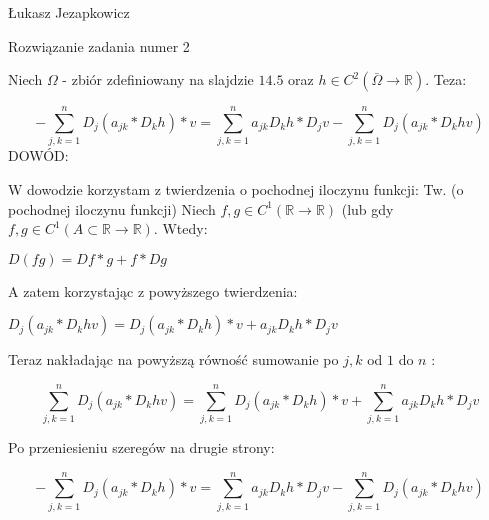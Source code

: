 \documentclass[12pt]{article}
\begin{document}
\begin{center}
\Large Łukasz Jezapkowicz
\end{center}
\begin{center}
\Large Rozwiązanie zadania numer 2 
\end{center}
Niech $\Omega$ - zbiór zdefiniowany na slajdzie $14.5$ oraz $h\in{C}^2(\bar{\Omega}\to\mathbb{R})$. Teza:
\begin{center}
\Large $$-\sum_{j,k=1}^{n} D_j(a_{jk}*D_kh)*v = \sum_{j,k=1}^{n}a_{jk}D_kh*D_jv-\sum_{j,k=1}^{n}D_j(a_{jk}*D_khv)$$ \newline
DOWÓD:
\end{center} 
W dowodzie korzystam z twierdzenia o pochodnej iloczynu funkcji: \newline
Tw. (o pochodnej iloczynu funkcji) \newline
Niech $f,g\in{C}^1(\mathbb{R}\to\mathbb{R})$ (lub gdy $f,g\in{C}^1(A\subset\mathbb{R}\to\mathbb{R})$. Wtedy: \newline
\begin{center}
\Large $D(fg)=Df*g + f*Dg$
\end{center}
A zatem korzystając z powyższego twierdzenia: \newline
\begin{center}
\Large $D_j(a_{jk}*D_khv) = D_j(a_{jk}*D_kh)*v + a_{jk}D_kh*D_jv$
\end{center}
Teraz nakładając na powyższą równość sumowanie po $j,k$ od $1$ do $n$ :
\begin{center}
\Large $$\sum_{j,k=1}^{n}D_j(a_{jk}*D_khv) = \sum_{j,k=1}^{n} D_j(a_{jk}*D_kh)*v + \sum_{j,k=1}^{n}a_{jk}D_kh*D_jv$$
\end{center}
Po przeniesieniu szeregów na drugie strony:
\begin{center}
\Large $$-\sum_{j,k=1}^{n} D_j(a_{jk}*D_kh)*v = \sum_{j,k=1}^{n}a_{jk}D_kh*D_jv-\sum_{j,k=1}^{n}D_j(a_{jk}*D_khv)$$
\end{center}
\end{document}
